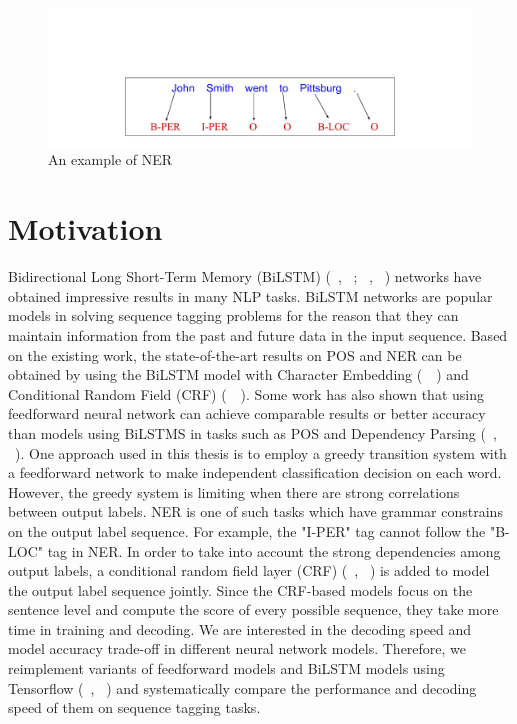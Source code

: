 \documentclass{sfuthesis}
\begin{document}
\begin{figure}
  \centering
  \includegraphics[scale=0.5]{nerex.pdf}
 \caption{An example of NER}
  \label{fig:ner-ex}
\end{figure}

\section{Motivation}

Bidirectional Long Short-Term Memory (BiLSTM) (~\citeauthor{Hochreiter97longshort-term}, ~\citeyear{Hochreiter97longshort-term}; ~\citeauthor{graves2005framewise}, ~\citeyear{graves2005framewise}) networks have obtained impressive results in many NLP tasks. BiLSTM networks are popular models in solving sequence tagging problems for the reason that they can maintain information from the past and future data in the input sequence. Based on the existing work, the state-of-the-art results on POS and NER can be obtained by using the BiLSTM model with Character Embedding (~\citeauthor{ling2015finding}~\citeyear{ling2015finding}) and Conditional Random Field (CRF) (~\citeauthor{lafferty2001conditional}~\citeyear{lafferty2001conditional}). Some work has also shown that using feedforward neural network can achieve comparable results or better accuracy than models using BiLSTMS in tasks such as POS and Dependency Parsing (~\citeauthor{andor2016globally}, ~\citeyear{andor2016globally}). One approach used in this thesis is to employ a greedy transition system with a feedforward network to make independent classification decision on each word. However, the greedy system is limiting when there are strong correlations between output labels. NER is one of such tasks which have grammar constrains on the output label sequence. For example, the "I-PER" tag cannot follow the "B-LOC" tag in NER. In order to take into account the strong dependencies among output labels, a conditional random field layer (CRF) (~\citeauthor{lafferty2001conditional}, ~\citeyear{lafferty2001conditional}) is added to model the output label sequence jointly. Since the CRF-based models focus on the sentence level and compute the score of every possible sequence, they take more time in training and decoding. We are interested in the decoding speed and model accuracy trade-off in different neural network models. Therefore, we reimplement variants of feedforward models and BiLSTM models using Tensorflow (~\citeauthor{abadi2016tensorflow}, ~\citeyear{abadi2016tensorflow}) and systematically compare the performance and decoding speed of them on sequence tagging tasks.
\end{document}
